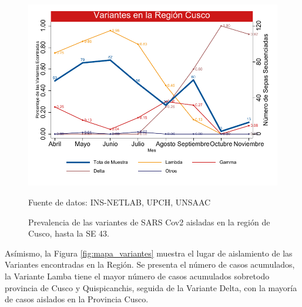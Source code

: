 \documentclass[12pt,a4paper,openany]{book}
\begin{document}
			
		\begin{figure}[h]
			\caption{Prevalencia de las variantes de SARS Cov2 aisladas en la región de Cusco, hasta la SE 43. }\label{fig:variantes}
			\begin{center}
				\includegraphics[width=0.85\linewidth]{../figuras/variantes.pdf}
			\end{center}
			{\footnotesize {Fuente de datos: INS-NETLAB, UPCH, UNSAAC}}
		\end{figure}
	
	
	Asímismo, la Figura \ref{fig:mapa_variantes}  muestra el lugar de aislamiento de las Variantes encontradas en la Región. Se presenta el número de casos acumulados, la Variante Lamba tiene el mayor número de casos acumulados sobretodo provincia de Cusco y Quispicanchis, seguida de la Variante Delta, con la mayoría de casos aislados en la Provincia Cusco. 
	
	
  
\end{document}
